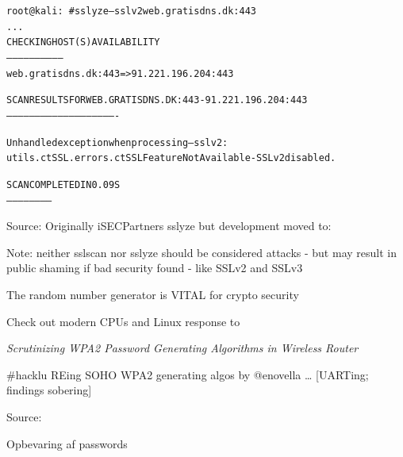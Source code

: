 \documentclass[20pt,landscape,a4paper,footrule]{foils}
\begin{document}

\begin{alltt}\small
root@kali:~# sslyze --sslv2 web.gratisdns.dk:443
...
 CHECKING HOST(S) AVAILABILITY
 -----------------------------
   web.gratisdns.dk:443                => 91.221.196.204:443

 SCAN RESULTS FOR WEB.GRATISDNS.DK:443 - 91.221.196.204:443
 ----------------------------------------------------------

Unhandled exception when processing --sslv2:
utils.ctSSL.errors.ctSSLFeatureNotAvailable - SSLv2 disabled.

 SCAN COMPLETED IN 0.09 S
 ------------------------
 \end{alltt}

Source:
Originally iSECPartners sslyze but development moved to:\\


Note: neither sslscan nor sslyze should be considered attacks - but may result in public shaming if bad security found - like SSLv2 and SSLv3



{\small{}}

\vskip 2cm
\centerline{The random number generator is VITAL for crypto security}

Check out modern CPUs and Linux response to 


\emph{Scrutinizing WPA2 Password Generating Algorithms in Wireless Router}

\#hacklu REing SOHO WPA2 generating algos  by @enovella  … [UARTing; findings sobering]

Source: 




\centerline{Opbevaring af passwords}




\end{document}
